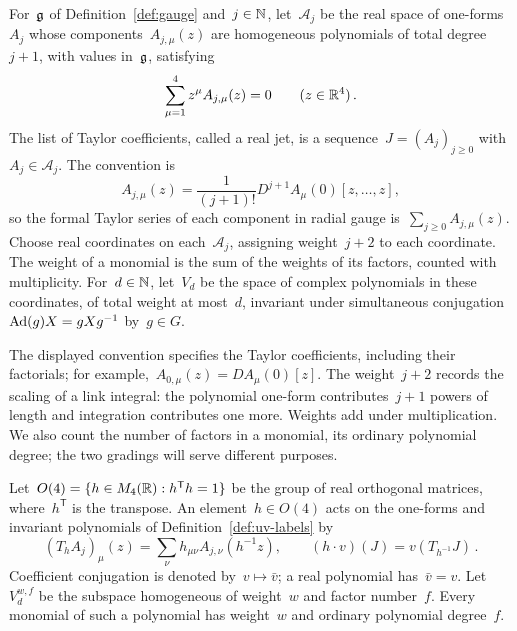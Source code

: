 \begin{definition}\label{def:uv-labels}
For~$\mathfrak g$ of Definition~\ref{def:gauge} and~$j\in\mathbb N$, let~$\mathcal A_j$ be the real space of one-forms~$A_j$ whose components~$A_{j,\mu}(z)$ are homogeneous polynomials of total degree~$j+1$, with values in~$\mathfrak g$, satisfying
\begin{equation}\label{eq:uv-radial}
 \sum_{\mu=1}^4 z^\mu A_{j,\mu}(z)=0\qquad(z\in\mathbb R^4)\,.
\end{equation}
The list of Taylor coefficients, called a real jet, is a sequence~$J=(A_j)_{j\ge0}$ with~$A_j\in\mathcal A_j$. The convention is
\begin{equation*}
 A_{j,\mu}(z)=\frac{1}{(j+1)!}D^{j+1}A_\mu(0)[z,\ldots,z],
\end{equation*}
so the formal Taylor series of each component in radial gauge is~$\sum_{j\ge0}A_{j,\mu}(z)$.
Choose real coordinates on each~$\mathcal A_j$, assigning weight~$j+2$ to each coordinate.
The weight of a monomial is the sum of the weights of its factors, counted with multiplicity.
For~$d\in\mathbb N$, let~$V_d$ be the space of complex polynomials in these coordinates, of total weight at most~$d$, invariant under simultaneous conjugation~$\operatorname{Ad}(g)X=gXg^{-1}$ by~$g\in G$.
\end{definition}

The displayed convention specifies the Taylor coefficients, including their factorials; for example,~$A_{0,\mu}(z)=DA_\mu(0)[z]$.
The weight~$j+2$ records the scaling of a link integral: the polynomial one-form contributes~$j+1$ powers of length and integration contributes one more.
Weights add under multiplication.
We also count the number of factors in a monomial, its ordinary polynomial degree; the two gradings will serve different purposes.

\begin{definition}\label{def:uv-actions}
Let~$O(4)=\{h\in M_4(\mathbb R):h^{\mathsf T}h=1\}$ be the group of real orthogonal matrices, where~$h^{\mathsf T}$ is the transpose.
An element~$h\in O(4)$ acts on the one-forms and invariant polynomials of Definition~\ref{def:uv-labels} by
\begin{equation}\label{eq:uv-label-action}
 (T_hA_j)_\mu(z)=\sum_\nu h_{\mu\nu}A_{j,\nu}(h^{-1}z),
 \qquad (h\cdot v)(J)=v(T_{h^{-1}}J)\,.
\end{equation}
Coefficient conjugation is denoted by~$v\mapsto\bar v$; a real polynomial has~$\bar v=v$.
Let~$V_d^{w,f}$ be the subspace homogeneous of weight~$w$ and factor number~$f$.
Every monomial of such a polynomial has weight~$w$ and ordinary polynomial degree~$f$.
\end{definition}

